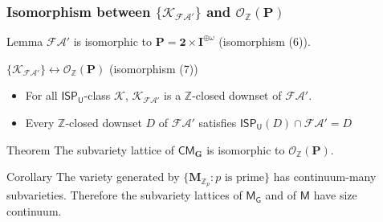 \documentclass[professionalfont, handout, 10pt]{beamer} %
\theoremstyle{plain}
\theoremstyle{definition}
\newcommand{\m}[1]{{\mathbf {#1} }}
\newcommand{\bb}[1]{\mathbb {#1}}
\begin{document}
\begin{frame}
\frametitle{Isomorphism between $\{\mathcal{K}_{\mathcal{FA}'}\}$ and $\mathcal{O}_{\bb{Z}}(\m P)$}
\begin{block}{Lemma}
    $\mathcal{FA}'$ is isomorphic to $\m P = \m 2 \times \m I^{\oplus \omega}$ (isomorphism (6)).
\end{block}
\pause
\begin{block}{$\{\mathcal{K}_{\mathcal{FA}'}\} \leftrightarrow \mathcal{O}_{\bb{Z}}(\m P)$ (isomorphism (7))}
\begin{itemize}
    \item For all $\mathsf{ISP_U}$-class $\mathcal{K}$, $\mathcal{K}_{\mathcal{FA}'}$ is a $\bb{Z}$-closed downset of $\mathcal{FA}'$.

    \item Every $\bb{Z}$-closed downset $D$ of $\mathcal{FA}'$ satisfies $\mathsf{ISP_U}(D) \cap \mathcal{FA}' = D$
\end{itemize}
\end{block}
\pause
\begin{block}{Theorem}
    The subvariety lattice of $\mathsf{CM}_{\mathbf{G}}$ is isomorphic to $\mathcal{O}_{\mathbb{Z}}(\m P)$.
\end{block}
\pause
\begin{block}{Corollary}
    The variety generated by $\{\m M_{\mathbb{Z}_p}: p \text{ is prime}\}$ has continuum-many subvarieties. 
    Therefore the subvariety lattices of $\mathsf{M_G}$ and of $\mathsf{M}$ have size continuum.
\end{block}

\end{frame}
\end{document}
